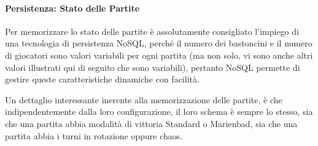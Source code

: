 \paragraph{Persistenza: Stato delle Partite \paragraphNewline}

\removeHorizontalSpaceSmall Per memorizzare lo stato delle partite è assolutamente consigliato l'impiego di una tecnologia di persistenza NoSQL, perché il numero dei bastoncini e il numero di giocatori sono valori variabili per ogni partita (ma non solo, vi sono anche altri valori illustrati qui di seguito che sono variabili), pertanto NoSQL permette di gestire queste caratteristiche dinamiche con facilità.

Un dettaglio interessante inerente alla memorizzazione delle partite, è che indipendentemente dalla loro configurazione, il loro schema è sempre lo stesso, sia che una partita abbia modalità di vittoria Standard o Marienbad, sia che una partita abbia i turni in rotazione oppure chaos.

